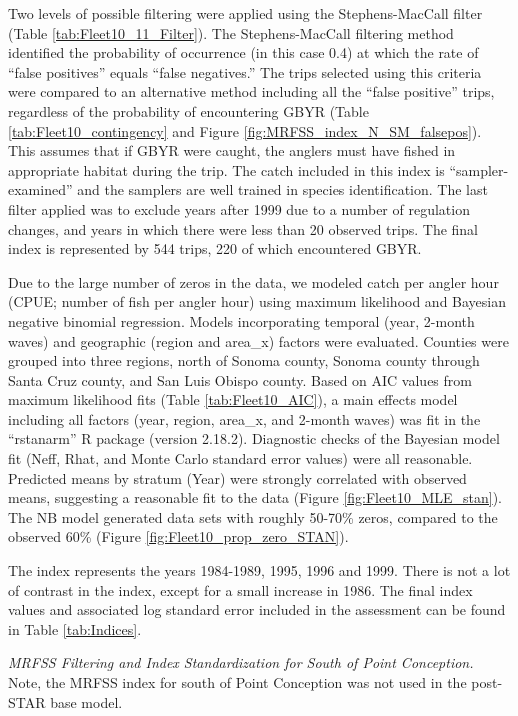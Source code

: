 \documentclass[12pt,]{article}
\begin{document}
Two levels of possible filtering were applied using the Stephens-MacCall
filter (Table \ref{tab:Fleet10_11_Filter}). The Stephens-MacCall
filtering method identified the probability of occurrence (in this case
0.4) at which the rate of ``false positives'' equals ``false
negatives.'' The trips selected using this criteria were compared to an
alternative method including all the ``false positive'' trips,
regardless of the probability of encountering GBYR (Table
\ref{tab:Fleet10_contingency} and Figure
\ref{fig:MRFSS_index_N_SM_falsepos}). This assumes that if GBYR were
caught, the anglers must have fished in appropriate habitat during the
trip. The catch included in this index is ``sampler-examined'' and the
samplers are well trained in species identification. The last filter
applied was to exclude years after 1999 due to a number of regulation
changes, and years in which there were less than 20 observed trips. The
final index is represented by 544 trips, 220 of which encountered GBYR.

Due to the large number of zeros in the data, we modeled catch per
angler hour (CPUE; number of fish per angler hour) using maximum
likelihood and Bayesian negative binomial regression. Models
incorporating temporal (year, 2-month waves) and geographic (region and
area\_x) factors were evaluated. Counties were grouped into three
regions, north of Sonoma county, Sonoma county through Santa Cruz
county, and San Luis Obispo county. Based on AIC values from maximum
likelihood fits (Table \ref{tab:Fleet10_AIC}), a main effects model
including all factors (year, region, area\_x, and 2-month waves) was fit
in the ``rstanarm'' R package (version 2.18.2). Diagnostic checks of the
Bayesian model fit (Neff, Rhat, and Monte Carlo standard error values)
were all reasonable. Predicted means by stratum (Year) were strongly
correlated with observed means, suggesting a reasonable fit to the data
(Figure \ref{fig:Fleet10_MLE_stan}). The NB model generated data sets
with roughly 50-70\% zeros, compared to the observed 60\% (Figure
\ref{fig:Fleet10_prop_zero_STAN}).

The index represents the years 1984-1989, 1995, 1996 and 1999. There is
not a lot of contrast in the index, except for a small increase in 1986.
The final index values and associated log standard error included in the
assessment can be found in Table \ref{tab:Indices}.

\emph{MRFSS Filtering and Index Standardization for South of Point
Conception.}\\
Note, the MRFSS index for south of Point Conception was not used in the
post-STAR base model.
\end{document}
